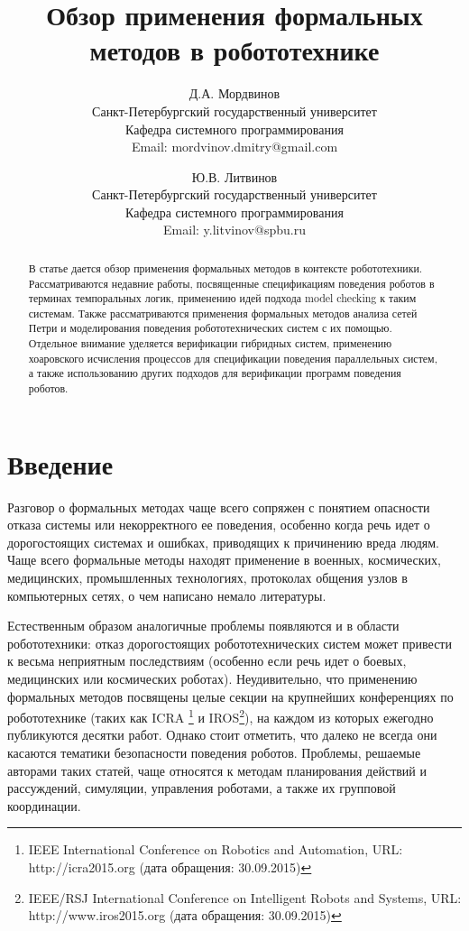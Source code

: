 \documentclass[a4, 14pt]{article}
\begin{document}
\title{Обзор применения формальных методов в робототехнике}

\author{
	Д.А. Мордвинов \\
	Санкт-Петербургский государственный университет\\
	Кафедра системного программирования\\
	Email: mordvinov.dmitry@gmail.com
\and
	Ю.В. Литвинов \\
	Санкт-Петербургский государственный университет\\
	Кафедра системного программирования\\
	Email: y.litvinov@spbu.ru
}

\maketitle

\begin{abstract}
В статье дается обзор применения формальных методов в контексте робототехники. 
Рассматриваются недавние работы, посвященные спецификациям поведения роботов в 
терминах темпоральных логик, применению идей подхода model checking к таким системам. 
Также рассматриваются применения формальных методов анализа сетей Петри и 
моделирования поведения робототехнических систем с их помощью. Отдельное внимание 
уделяется верификации гибридных систем, применению хоаровского исчисления процессов 
для спецификации поведения параллельных систем, а также использованию других 
подходов для верификации программ поведения роботов.
\end{abstract}

\section{Введение}
Разговор о формальных методах чаще всего сопряжен с понятием опасности отказа 
системы или некорректного ее поведения, особенно когда речь идет о дорогостоящих 
системах и ошибках, приводящих к причинению вреда людям. Чаще всего формальные 
методы находят применение в военных, космических, медицинских, промышленных 
технологиях, протоколах общения узлов в компьютерных сетях, о чем написано немало 
литературы. 

Естественным образом аналогичные проблемы появляются и в области робототехники: 
отказ дорогостоящих робототехнических систем может привести к весьма неприятным 
последствиям (особенно если речь идет о боевых, медицинских или космических 
роботах). Неудивительно, что применению формальных методов посвящены целые 
секции на крупнейших конференциях по робототехнике (таких как ICRA%
\footnote{IEEE International Conference on Robotics and Automation, URL: http://icra2015.org (дата обращения: 30.09.2015)}
и IROS\footnote{IEEE/RSJ International Conference on Intelligent Robots and Systems, URL: http://www.iros2015.org (дата обращения: 30.09.2015)}), 
на каждом из которых ежегодно публикуются десятки работ. Однако стоит отметить, 
что далеко не всегда они касаются тематики безопасности поведения роботов. 
Проблемы, решаемые авторами таких статей, чаще относятся к методам планирования 
действий и рассуждений, симуляции, управления роботами, а также их групповой 
координации.
\end{document}
